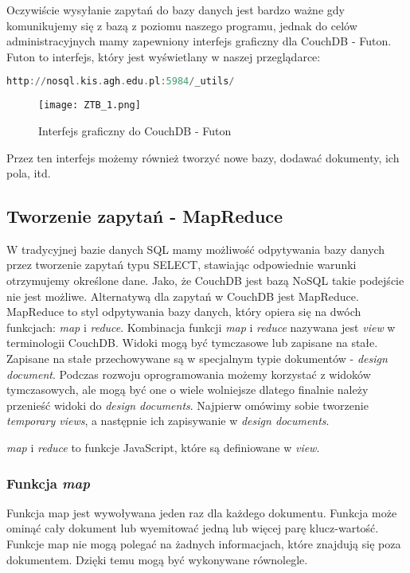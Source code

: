 \documentclass[a4paper,15pt]{article}
\newcommand{\issue}[2]{
    \begin{tcolorbox}[colback=issueColor!5!white,colframe=issueColor,title={Pamiętaj #1}]
        #2
    \end{tcolorbox}
}
\begin{document}
Oczywiście wysyłanie zapytań do bazy danych jest bardzo ważne gdy komunikujemy się z bazą z poziomu naszego programu, jednak do celów administracyjnych mamy zapewniony interfejs graficzny dla CouchDB - Futon. Futon to interfejs, który jest wyświetlany w naszej przeglądarce:

\begin{lstlisting}[language=Ada, caption=Przejscie do panelu administratora w przegladarce]
http://nosql.kis.agh.edu.pl:5984/_utils/
\end{lstlisting}

\begin{figure}[H]
\centering
  \texttt{[image: ZTB\_1.png]}
  \caption{Interfejs graficzny do CouchDB - Futon}
\end{figure}

Przez ten interfejs możemy również tworzyć nowe bazy, dodawać dokumenty, ich pola, itd. 

\subsection{Tworzenie zapytań - MapReduce}

W tradycyjnej bazie danych SQL mamy możliwość odpytywania bazy danych przez tworzenie zapytań typu SELECT, stawiając odpowiednie warunki otrzymujemy określone dane. Jako, że CouchDB jest bazą NoSQL takie podejście nie jest możliwe. Alternatywą dla zapytań w CouchDB jest MapReduce. \\

MapReduce to styl odpytywania bazy danych, który opiera się na dwóch funkcjach: \textit{map} i \textit{reduce}. Kombinacja funkcji \textit{map} i \textit{reduce} nazywana jest \textit{view} w terminologii CouchDB. Widoki mogą być tymczasowe lub zapisane na stałe. Zapisane na stałe przechowywane są w specjalnym typie dokumentów - \textit{design document}. Podczas rozwoju oprogramowania możemy korzystać z widoków tymczasowych, ale mogą być one o wiele wolniejsze dlatego finalnie należy przenieść widoki do \textit{design documents}. Najpierw omówimy sobie tworzenie \textit{temporary views}, a następnie ich zapisywanie w \textit{design documents}.  

\issue{}{
\textit{map} i \textit{reduce} to funkcje JavaScript, które są definiowane w \textit{view}. 
}

\subsubsection{Funkcja \textit{map}}
Funkcja map jest wywoływana jeden raz dla każdego dokumentu. Funkcja może ominąć cały dokument lub wyemitować jedną lub więcej parę klucz-wartość. Funkcje map nie mogą polegać na żadnych informacjach, które znajdują się poza dokumentem. Dzięki temu mogą być wykonywane równolegle. \\
\end{document}
